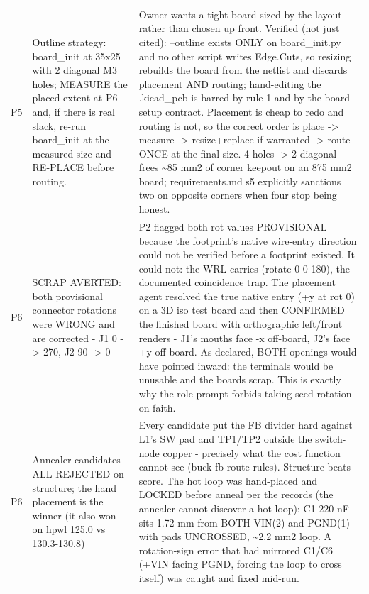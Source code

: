 \documentclass[11pt,a4paper]{article}
\begin{document}
{\begin{longtable}{lp{5.2cm}p{7.2cm}}
P5 & Outline strategy: board\_init at 35x25 with 2 diagonal M3 holes; MEASURE the placed extent at P6 and, if there is real slack, re-run board\_init at the measured size and RE-PLACE before routing. & Owner wants a tight board sized by the layout rather than chosen up front. Verified (not just cited): --outline exists ONLY on board\_init.py and no other script writes Edge.Cuts, so resizing rebuilds the board from the netlist and discards placement AND routing; hand-editing the .kicad\_pcb is barred by rule 1 and by the board-setup contract. Placement is cheap to redo and routing is not, so the correct order is place -\textgreater{} measure -\textgreater{} resize+replace if warranted -\textgreater{} route ONCE at the final size. 4 holes -\textgreater{} 2 diagonal frees \textasciitilde{}85 mm2 of corner keepout on an 875 mm2 board; requirements.md s5 explicitly sanctions two on opposite corners when four stop being honest. \\
P6 & SCRAP AVERTED: both provisional connector rotations were WRONG and are corrected - J1 0 -\textgreater{} 270, J2 90 -\textgreater{} 0 & P2 flagged both rot values PROVISIONAL because the footprint's native wire-entry direction could not be verified before a footprint existed. It could not: the WRL carries (rotate 0 0 180), the documented coincidence trap. The placement agent resolved the true native entry (+y at rot 0) on a 3D iso test board and then CONFIRMED the finished board with orthographic left/front renders - J1's mouths face -x off-board, J2's face +y off-board. As declared, BOTH openings would have pointed inward: the terminals would be unusable and the boards scrap. This is exactly why the role prompt forbids taking seed rotation on faith. \\
P6 & Annealer candidates ALL REJECTED on structure; the hand placement is the winner (it also won on hpwl 125.0 vs 130.3-130.8) & Every candidate put the FB divider hard against L1's SW pad and TP1/TP2 outside the switch-node copper - precisely what the cost function cannot see (buck-fb-route-rules). Structure beats score. The hot loop was hand-placed and LOCKED before anneal per the records (the annealer cannot discover a hot loop): C1 220 nF sits 1.72 mm from BOTH VIN(2) and PGND(1) with pads UNCROSSED, \textasciitilde{}2.2 mm2 loop. A rotation-sign error that had mirrored C1/C6 (+VIN facing PGND, forcing the loop to cross itself) was caught and fixed mid-run. \\

\end{longtable}}
\end{document}
